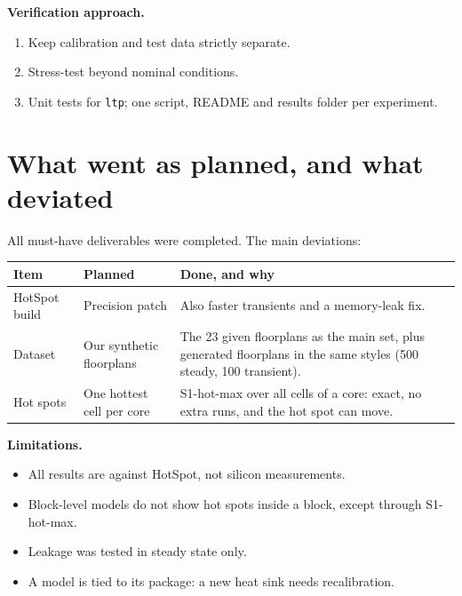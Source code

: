 \documentclass[11pt,a4paper]{article}
\begin{document}
\textbf{Verification approach.}
\begin{enumerate}
  \item Keep calibration and test data strictly separate.
  \item Stress-test beyond nominal conditions.
  \item Unit tests for \texttt{ltp}; one script, README and results folder per experiment.
\end{enumerate}

\section{What went as planned, and what deviated}
All must-have deliverables were completed. The main deviations:
\begin{center}
\small
\begin{tabular}{@{}p{3cm} p{4.3cm} p{7.7cm}@{}}
\toprule
Item & Planned & Done, and why \\
\midrule
HotSpot build & Precision patch & Also faster transients and a memory-leak fix. \\
Dataset & Our synthetic floorplans & The 23 given floorplans as the main set, plus generated floorplans in the same styles (500 steady, 100 transient). \\
Hot spots & One hottest cell per core & S1-hot-max over all cells of a core: exact, no extra runs, and the hot spot can move. \\
\bottomrule
\end{tabular}
\end{center}

\textbf{Limitations.}
\begin{itemize}
  \item All results are against HotSpot, not silicon measurements.
  \item Block-level models do not show hot spots inside a block, except through S1-hot-max.
  \item Leakage was tested in steady state only.
  \item A model is tied to its package: a new heat sink needs recalibration.
\end{itemize}

\end{document}
